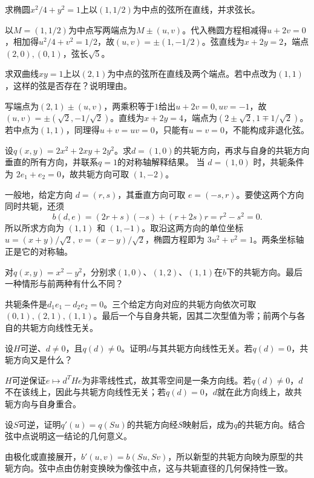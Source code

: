 求椭圆\(x^2/4+y^2=1\)上以\((1,1/2)\)为中点的弦所在直线，并求弦长。
\par
\solutionanswer
以\(M=(1,1/2)\)为中点写两端点为\(M\pm(u,v)\)。代入椭圆方程相减得\(u+2v=0\)，相加得\(u^2/4+v^2=1/2\)，故\((u,v)=\pm(1,-1/2)\)。弦直线为\(x+2y=2\)，端点\((2,0),(0,1)\)，弦长\(\sqrt5\)。


求双曲线\(xy=1\)上以\((2,1)\)为中点的弦所在直线及两个端点。若中点改为\((1,1)\)，这样的弦是否存在？说明理由。
\par
\solutionanswer
写端点为\((2,1)\pm(u,v)\)，两乘积等于\(1\)给出\(u+2v=0,uv=-1\)，故\((u,v)=\pm(\sqrt2,-1/\sqrt2)\)。直线为\(x+2y=4\)，端点为\((2\pm\sqrt2,1\mp1/\sqrt2)\)。若中点为\((1,1)\)，同理得\(u+v=uv=0\)，只能有\(u=v=0\)，不能构成非退化弦。


设\(q(x,y)=2x^2+2xy+2y^2\)。求\(d=(1,0)\)的共轭方向，再求与自身的共轭方向垂直的所有方向，并联系\(q=1\)的对称轴解释结果。
\solutionanswer
当 \(d=(1,0)\) 时，共轭条件为 \(2e_1+e_2=0\)，故共轭方向可取 \((1,-2)\)。

一般地，给定方向 \(d=(r,s)\)，其垂直方向可取 \(e=(-s,r)\)。要使这两个方向同时共轭，还须
\[
 b(d,e)=(2r+s)(-s)+(r+2s)r=r^2-s^2=0.
\]
所以所求方向为 \((1,1)\) 和 \((1,-1)\)。取沿这两方向的单位坐标 \(u=(x+y)/\sqrt2,\ v=(x-y)/\sqrt2\)，椭圆方程即为 \(3u^2+v^2=1\)。两条坐标轴正是它的对称轴。


对\(q(x,y)=x^2-y^2\)，分别求\((1,0)\)、\((1,2)\)、\((1,1)\)在\(b\)下的共轭方向。最后一种情形与前两种有什么不同？
\par
\solutionanswer
共轭条件是\(d_1e_1-d_2e_2=0\)。三个给定方向对应的共轭方向依次可取\((0,1),(2,1),(1,1)\)。最后一个与自身共轭，因其二次型值为零；前两个与各自的共轭方向线性无关。


设\(H\)可逆、\(d\ne0\)，且\(q(d)\ne0\)。证明\(d\)与其共轭方向线性无关。若\(q(d)=0\)，共轭方向又是什么？
\par
\solutionanswer
\(H\)可逆保证\(e\mapsto d^THe\)为非零线性式，故其零空间是一条方向线。若\(q(d)\ne0\)，\(d\)不在该线上，因此与共轭方向线性无关；若\(q(d)=0\)，\(d\)就在此方向线上，故共轭方向与自身重合。


设\(S\)可逆，证明\(q'(u)=q(Su)\)的共轭方向经\(S\)映射后，成为\(q\)的共轭方向。结合弦中点说明这一结论的几何意义。
\par
\solutionanswer
由极化或直接展开，\(b'(u,v)=b(Su,Sv)\)，所以新型的共轭方向映为原型的共轭方向。弦中点由仿射变换映为像弦中点，这与共轭直径的几何保持性一致。


